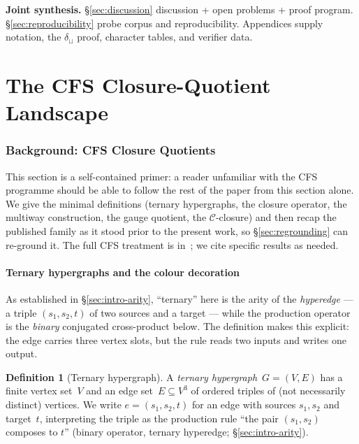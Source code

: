 \documentclass[12pt,a4paper]{article}
\theoremstyle{definition}
\newtheorem{definition}[theorem]{Definition}
\theoremstyle{remark}
\newcommand{\Ccls}{\mathcal{C}}             %
\begin{document}
\textbf{Joint synthesis.}
\S\ref{sec:discussion} discussion + open problems + proof program.
\S\ref{sec:reproducibility} probe corpus and reproducibility.
Appendices supply notation, the $\delta_\sqcup$ proof, character tables,
and verifier data.

\part{The CFS Closure-Quotient Landscape}

\section{Background: CFS Closure Quotients}\label{sec:background}

This section is a self-contained primer: a reader unfamiliar with the
CFS programme should be able to follow the rest of the paper from this
section alone. We give the minimal definitions (ternary hypergraphs,
the closure operator, the multiway construction, the gauge quotient,
the $\Ccls$-closure) and then recap the published family as it stood
prior to the present work, so \S\ref{sec:regrounding} can re-ground it.
The full CFS treatment is in~\cite{CFS2026}; we cite specific results
as needed.

\subsection{Ternary hypergraphs and the colour decoration}
\label{sec:bg-hypergraphs}

As established in \S\ref{sec:intro-arity}, ``ternary'' here is the arity
of the \emph{hyperedge} --- a triple $(s_1, s_2, t)$ of two sources and
a target --- while the production operator is the \emph{binary}
conjugated cross-product below. The definition makes this explicit: the
edge carries three vertex slots, but the rule reads two inputs and
writes one output.

\begin{definition}[Ternary hypergraph]\label{def:thyp}
A \emph{ternary hypergraph}~$G = (V, E)$ has a finite vertex set~$V$
and an edge set~$E \subseteq V^3$ of ordered triples of (not
necessarily distinct) vertices. We write $e = (s_1, s_2, t)$ for an
edge with sources $s_1, s_2$ and target~$t$, interpreting the triple
as the production rule ``the pair $(s_1, s_2)$ composes to $t$''
(binary operator, ternary hyperedge; \S\ref{sec:intro-arity}).
\end{definition}
\end{document}
